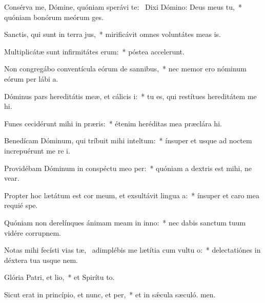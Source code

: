 \item Consérva me, Dómine, quóniam sperávi  te:~\pscross{} Dixi Dómino: Deus meus  tu,~* quóniam bonórum meórum  ges.
\item Sanctis, qui sunt in terra jus,~* mirificávit omnes voluntátes meas  is.
\item Multiplicátæ sunt infirmitátes erum:~* póstea accelerunt.
\item Non congregábo conventícula eórum de sannibus,~* nec memor ero nóminum eórum per lábi a.
\item Dóminus pars hereditátis meæ, et cálicis i:~* tu es, qui restítues hereditátem me hi.
\item Funes cecidérunt mihi in præris:~* étenim heréditas mea præclára  hi.
\item Benedícam Dóminum, qui tríbuit mihi inteltum:~* ínsuper et usque ad noctem increpuérunt me re i.
\item Providébam Dóminum in conspéctu meo per:~* quóniam a dextris est mihi, ne vear.
\item Propter hoc lætátum est cor meum, et exsultávit lingua a:~* ínsuper et caro mea requié  spe.
\item Quóniam non derelínques ánimam meam in inno:~* nec dabis sanctum tuum vidére corrupnem.
\item Notas mihi fecísti vias tæ,~\pscross{} adimplébis me lætítia cum vultu o:~* delectatiónes in déxtera tua usque  nem.
\item Glória Patri, et lio,~* et Spirítu to.
\item Sicut erat in princípio, et nunc, et per,~* et in sǽcula sæculó. men.
